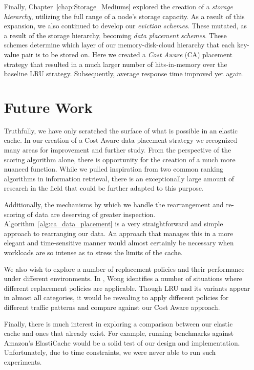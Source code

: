 Finally, Chapter~\ref{chap:Storage_Mediums} explored the creation of a
\emph{storage hierarchy}, utilizing the full range of a node's storage
capacity. As a result of this expansion, we also continued to develop our
\emph{eviction schemes}. These mutated, as a result of the storage hierarchy,
becoming \emph{data placement schemes}. These schemes determine which layer of
our memory-disk-cloud hierarchy that each key-value pair is to be stored on.
Here we created a \emph{Cost Aware} (CA) placement strategy that resulted in a
much larger number of hits-in-memory over the baseline LRU strategy.
Subsequently, average response time improved yet again.


\section{Future Work} %
\label{sec:future_work}
Truthfully, we have only scratched the surface of what is possible in an
elastic cache. In our creation of a Cost Aware data placement strategy we
recognized many areas for improvement and further study. From the perspective
of the scoring algorithm alone, there is opportunity for the creation of a much
more nuanced function. While we pulled inspiration from two common ranking
algorithms in information retrieval\cite{tfidf,bm25}, there is an exceptionally
large amount of research in the field that could be further adapted to this
purpose.

Additionally, the mechanisms by which we handle the rearrangement and
re-scoring of data are deserving of greater inspection.
Algorithm~\ref{alg:ca_data_placement} is a very straightforward and simple
approach to rearranging our data. An approach that manages this in a more
elegant and time-sensitive manner would almost certainly be necessary when
workloads are so intense as to stress the limits of the cache.

We also wish to explore a number of replacement policies and their performance
under different environments. In \cite{web_replacement_policies}, Wong
identifies a number of situations where different replacement policies are
applicable. Though LRU and its variants appear in almost all categories, it
would be revealing to apply different policies for different traffic patterns
and compare against our Cost Aware approach.

Finally, there is much interest in exploring a comparison between our elastic
cache and ones that already exist. For example, running benchmarks against
Amazon's ElastiCache\cite{amazonElastiCache} would be a solid test of our
design and implementation. Unfortunately, due to time constraints, we were
never able to run such experiments.

